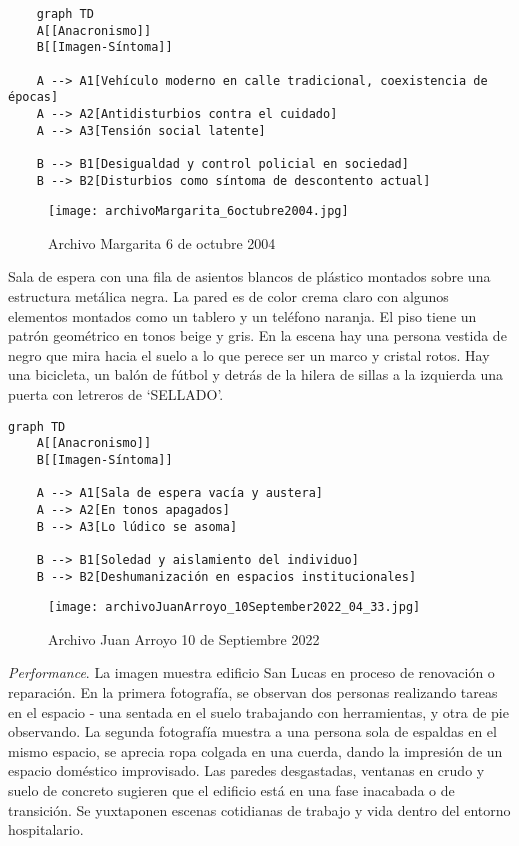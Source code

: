 \small
\singlespacing \begin{verbatim}
    graph TD
    A[[Anacronismo]]
    B[[Imagen-Síntoma]]

    A --> A1[Vehículo moderno en calle tradicional, coexistencia de épocas]
    A --> A2[Antidisturbios contra el cuidado]
    A --> A3[Tensión social latente]

    B --> B1[Desigualdad y control policial en sociedad]
    B --> B2[Disturbios como síntoma de descontento actual]
\end{verbatim}
\normalsize

\clearpage
\begin{figure}[h!]
    \centering
    \texttt{[image: archivoMargarita\_6octubre2004.jpg]}
    \caption{Archivo Margarita 6 de octubre 2004}
    \label{fig:archivoMargarita_6octubre2004}
\end{figure}

Sala de espera con una fila de asientos blancos de plástico montados sobre una estructura metálica negra. La pared es de color crema claro con algunos elementos montados como un tablero y un teléfono naranja. El piso tiene un patrón geométrico en tonos beige y gris. En la escena hay una persona vestida de negro que mira hacia el suelo a lo que perece ser un marco y cristal rotos. Hay una bicicleta, un balón de fútbol y detrás de la hilera de sillas a la izquierda una puerta con letreros de `SELLADO'.

\small
\singlespacing \begin{verbatim}
graph TD
    A[[Anacronismo]]
    B[[Imagen-Síntoma]]
    
    A --> A1[Sala de espera vacía y austera]
    A --> A2[En tonos apagados]
    B --> A3[Lo lúdico se asoma]
    
    B --> B1[Soledad y aislamiento del individuo]
    B --> B2[Deshumanización en espacios institucionales]
\end{verbatim}
\normalsize

\clearpage
\begin{figure}[h!]
    \centering
    \texttt{[image: archivoJuanArroyo\_10September2022\_04\_33.jpg]}
    \caption{Archivo Juan Arroyo 10 de Septiembre 2022}
    \label{fig:archivoJuanArroyo_10September2022_04_33}
\end{figure}

\textit{Performance}. La imagen muestra edificio San Lucas en proceso de renovación o reparación. En la primera fotografía, se observan dos personas realizando tareas en el espacio - una sentada en el suelo trabajando con herramientas, y otra de pie observando. La segunda fotografía muestra a una persona sola de espaldas en el mismo espacio, se aprecia ropa colgada en una cuerda, dando la impresión de un espacio doméstico improvisado. Las paredes desgastadas, ventanas en crudo y suelo de concreto sugieren que el edificio está en una fase inacabada o de transición. Se yuxtaponen  escenas cotidianas de trabajo y vida dentro del entorno hospitalario.

